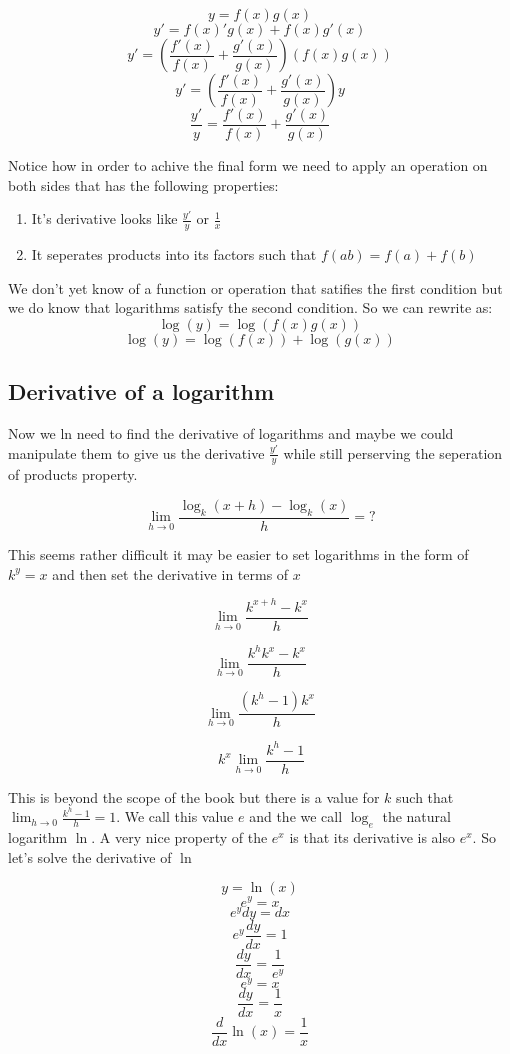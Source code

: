 \documentclass[12pt]{book}
\begin{document}
$$y=f(x)g(x)$$
$$y'=f(x)'g(x)+f(x)g'(x)$$
$$y'=\left(\frac{f'(x)}{f(x)} + \frac{g'(x)}{g(x)}\right)(f(x)g(x))$$
$$y'=\left(\frac{f'(x)}{f(x)} + \frac{g'(x)}{g(x)}\right)y$$
$$\frac{y'}{y}=\frac{f'(x)}{f(x)} + \frac{g'(x)}{g(x)}$$

Notice how in order to achive the final form we need to apply an operation on both sides that has the following properties:
\begin{enumerate}
	\item It's derivative looks like $\frac{y'}{y}$ or $\frac{1}{x}$
	\item It seperates products into its factors such that $f(ab) = f(a) + f(b)$
\end{enumerate}

We don't yet know of a function or operation that satifies the first condition but we do know that logarithms satisfy the second condition. So we can rewrite as:
$$\log(y)=\log(f(x)g(x))$$
$$\log(y)=\log(f(x))+ \log(g(x))$$
\subsection{Derivative of a logarithm}
Now we ln need to find the derivative of logarithms and maybe we could manipulate them to give us the derivative $\frac{y'}{y}$ while still perserving the seperation of products property.

\[
\lim_{h \to 0} \frac{\log_k(x+h)-\log_k(x)}{h} = ?
\]

This seems rather difficult it may be easier to set logarithms in the form of $k^y = x$ and then set the derivative in terms of $x$

\[
\lim_{h \to 0} \frac{k^{x+h}-k^x}{h}
\]

\[
\lim_{h \to 0} \frac{k^hk^{x}-k^x}{h}
\]

\[
\lim_{h \to 0} \frac{(k^h-1)k^{x}}{h}
\]

\[
\ k^x \lim_{h \to 0} \frac{k^h-1}{h}
\]

This is beyond the scope of the book but there is a value for $k$ such that \( \displaystyle \lim_{h \to 0} \frac{k^h-1}{h} = 1\).
We call this value $e$ and the we call $\log_e$ the natural logarithm $\ln$. A very nice property of the $e^x$ is that its derivative is also $e^x$. So let's solve the derivative of $\ln$

$$y = \ln(x)$$
$$e^y = x$$
$$e^ydy = dx$$
$$e^y\frac{dy}{dx} = 1$$
$$\frac{dy}{dx} = \frac{1}{e^y}$$
$$e^y = x$$
$$\frac{dy}{dx} = \frac{1}{x}$$
$$\frac{d}{dx}\ln(x) = \frac{1}{x}$$
\end{document}
